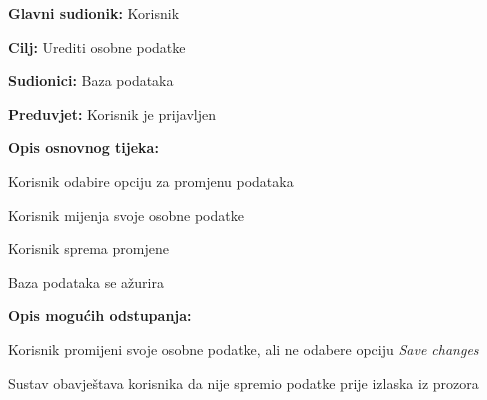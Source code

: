 					\noindent {}
					\begin{packed_item}
	
						\item \textbf{Glavni sudionik: }Korisnik
						\item  \textbf{Cilj:} Urediti osobne podatke
						\item  \textbf{Sudionici:} Baza podataka
						\item  \textbf{Preduvjet:} Korisnik je prijavljen
						\item  \textbf{Opis osnovnog tijeka:}
						
						\item[] \begin{packed_enum}
	
							\item Korisnik odabire opciju za promjenu podataka
							\item Korisnik mijenja svoje osobne podatke
							\item Korisnik sprema promjene
							\item Baza podataka se ažurira

						\end{packed_enum}
						
						\item  \textbf{Opis mogućih odstupanja:}
						
						\item[] \begin{packed_item}
	
							\item[2.a] Korisnik promijeni svoje osobne podatke, ali ne odabere opciju \textit{Save changes}
							\item[] \begin{packed_enum}
								
								\item Sustav obavještava korisnika da nije spremio podatke prije izlaska iz prozora
								
							\end{packed_enum}
							
						\end{packed_item}
					\end{packed_item}
					
